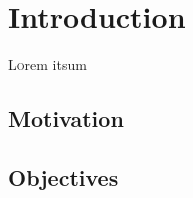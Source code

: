 \chapter{Introduction}
\label{ch:Introduction}
\lettrine[lraise=-0.1, lines=2, loversize=0.2]{L}{o}rem itsum





\section{Motivation}
\label{sec:Motivation}

\section{Objectives}
\label{sec:Objectives}


\endinput
